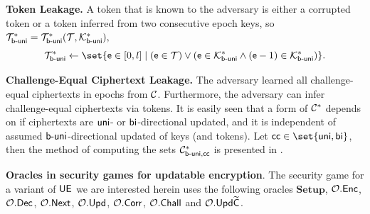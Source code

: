\documentclass{fundam}
\begin{document}
\vspace{0.1cm}
\noindent\textbf{Token Leakage.} A token that is known to the adversary is either a corrupted token or a token inferred from two consecutive epoch keys, so $\mathcal{T}_{\mathsf{b}{\text{-}}\mathsf{uni}}^{*} = \mathcal{T}_{\mathsf{b}{\text{-}}\mathsf{uni}}^{*} (\mathcal{T}, \mathcal{K}_{\mathsf{b}{\text{-}}\mathsf{uni}}^{*}),$
$$\Set{T}_{\opuni}^{*} \gets \set{\epoch\in [0,l]\mid  (\epoch \in \Set{T}) \lor (\epoch \in \Set{K}_{\opuni}^{*} \land (\epoch -1)\in  \Set{K}_{\opuni}^{*})  }.$$

\vspace{0.1cm}
\noindent\textbf{Challenge-Equal Ciphertext Leakage.} The adversary learned all challenge-equal ciphertexts in epochs from $\mathcal{C}$. Furthermore, the adversary can infer challenge-equal ciphertexts via tokens. It is easily seen that a form of $\mathcal{C}^{*}$ depends on if ciphertexts are $\mathsf{uni}$- or $\mathsf{bi}$-directional updated, and it is independent of assumed $\mathsf{b}{\text{-}}\mathsf{uni}$-directional updated of keys (and tokens). Let $\tx{cc}\in \set{\tx{uni}, \tx{bi}}$, then the method of computing the sets $\mathcal{C}_{\mathsf{b}{\text{-}}\mathsf{uni}, \mathsf{cc}}^{*}$ is presented in \cite{jiang2020}.

\vspace{0.1cm}
\noindent\textbf{Oracles in security games for updatable encryption}. The security game for a variant of $\mathsf{UE}$ we are interested herein uses the following oracles $\mathbf{Setup}$, $\mathcal{O}.\mathsf{Enc}$, $\mathcal{O}.\mathsf{Dec}$, $\mathcal{O}.\mathsf{Next}$, $\mathcal{O}.\mathsf{Upd}$, $\mathcal{O}.\mathsf{Corr}$, $\mathcal{O}.\mathsf{Chall}$ and $\mathcal{O}.\mathsf{Upd}\widetilde{\mathsf{C}}$.  
\end{document}
